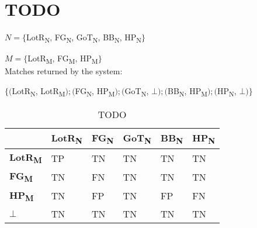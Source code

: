 






\section{TODO}

$N = \{$LotR\textsubscript{N}, FG\textsubscript{N}, GoT\textsubscript{N}, BB\textsubscript{N}, HP\textsubscript{N}$\}$

$M = \{$LotR\textsubscript{M}, FG\textsubscript{M}, HP\textsubscript{M}$\}$ \\

Matches returned by the system:

$\{
($LotR\textsubscript{N}, LotR\textsubscript{M}$);
($FG\textsubscript{N}, HP\textsubscript{M}$);
($GoT\textsubscript{N}, $\mathbf{\bot});
($BB\textsubscript{N}, HP\textsubscript{M}$);
($HP\textsubscript{N}, $\mathbf{\bot})
\}$

\begin{table}[h]
\centering
\begin{tabular}{l||l|l|l|l|l}
                       & \textbf{LotR\textsubscript{N}} & \textbf{FG\textsubscript{N}} & \textbf{GoT\textsubscript{N}} & \textbf{BB\textsubscript{N}} & \textbf{HP\textsubscript{N}} \\ \hline \hline
\textbf{LotR\textsubscript{M}}  & TP                    & TN                  & TN                   & TN                   & TN                  \\ \hline
\textbf{FG\textsubscript{M}}    & TN                    & FN                  & TN                   & TN                   & TN                  \\ \hline
\textbf{HP\textsubscript{M}}    & TN                    & FP                  & TN                   & FP                   & FN                  \\ \hline
$\mathbf{\bot}$                 & TN                    & TN                  & TN                   & TN                   & TN                  \\ 
\end{tabular}
\caption{TODO}
\label{tab_appendix}
\end{table}




